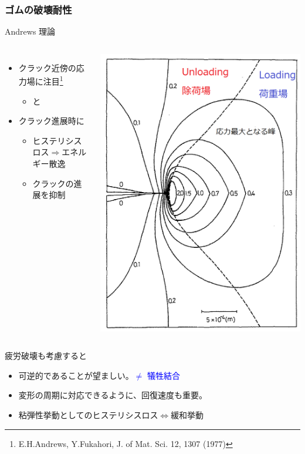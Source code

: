 \documentclass[aspectratio=169,11pt, dvipdfmx]{beamer}
\begin{document}
\begin{frame}
	\frametitle{ゴムの破壊耐性}
		\begin{exampleblock}{Andrews 理論}
			\begin{columns}[T, onlytextwidth]
				\begin{itemize}
					\item クラック近傍の応力場に注目\footnote{
						\scriptsize
			{E.H.Andrews, Y.Fukahori, J. of Mat. Sci. 12, 1307 (1977)}
					}
						\begin{itemize}
							\item \color{blue}{Loading 場}と \color{red}{Unloading 場}
						\end{itemize}
					\item クラック進展時に\color{green}{応力場が遷移}
						\begin{itemize}
							\item ヒステリシスロス$\Rightarrow${エネルギー散逸}
							\item クラックの進展を\alert{抑制}
						\end{itemize}
				\end{itemize}
                    \vspace*{2mm}
                    \centering
						\includegraphics[width=.45\textwidth]{crack.png}
			\end{columns}
		\end{exampleblock}
		\begin{alertblock}{疲労破壊も考慮すると}
			\begin{itemize}
				\item \alert{可逆的}であることが望ましい。\textcolor{blue}{$\neq$ 犠牲結合}
				\item 変形の周期に対応できるように、\alert{回復速度}も重要。
				\item \alert{粘弾性挙動としてのヒステリシスロス$\Leftrightarrow$緩和挙動}
			\end{itemize}
		\end{alertblock}
\end{frame}
\end{document}

